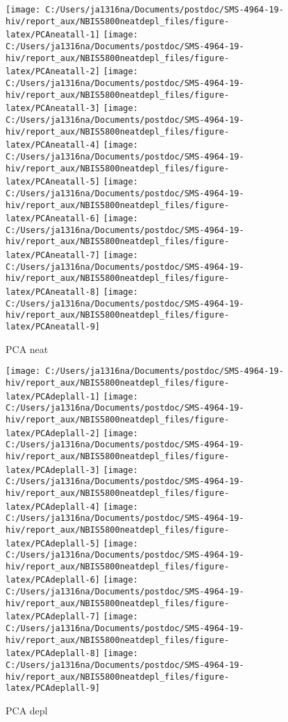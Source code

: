 \documentclass[
]{article}
\begin{document}
\begin{figure}
\texttt{[image: C:/Users/ja1316na/Documents/postdoc/SMS-4964-19-hiv/report\_aux/NBIS5800neatdepl\_files/figure-latex/PCAneatall-1]} \texttt{[image: C:/Users/ja1316na/Documents/postdoc/SMS-4964-19-hiv/report\_aux/NBIS5800neatdepl\_files/figure-latex/PCAneatall-2]} \texttt{[image: C:/Users/ja1316na/Documents/postdoc/SMS-4964-19-hiv/report\_aux/NBIS5800neatdepl\_files/figure-latex/PCAneatall-3]} \texttt{[image: C:/Users/ja1316na/Documents/postdoc/SMS-4964-19-hiv/report\_aux/NBIS5800neatdepl\_files/figure-latex/PCAneatall-4]} \texttt{[image: C:/Users/ja1316na/Documents/postdoc/SMS-4964-19-hiv/report\_aux/NBIS5800neatdepl\_files/figure-latex/PCAneatall-5]} \texttt{[image: C:/Users/ja1316na/Documents/postdoc/SMS-4964-19-hiv/report\_aux/NBIS5800neatdepl\_files/figure-latex/PCAneatall-6]} \texttt{[image: C:/Users/ja1316na/Documents/postdoc/SMS-4964-19-hiv/report\_aux/NBIS5800neatdepl\_files/figure-latex/PCAneatall-7]} \texttt{[image: C:/Users/ja1316na/Documents/postdoc/SMS-4964-19-hiv/report\_aux/NBIS5800neatdepl\_files/figure-latex/PCAneatall-8]} \texttt{[image: C:/Users/ja1316na/Documents/postdoc/SMS-4964-19-hiv/report\_aux/NBIS5800neatdepl\_files/figure-latex/PCAneatall-9]} \caption{PCA neat}\label{fig:PCAneatall}
\end{figure}

\begin{figure}
\texttt{[image: C:/Users/ja1316na/Documents/postdoc/SMS-4964-19-hiv/report\_aux/NBIS5800neatdepl\_files/figure-latex/PCAdeplall-1]} \texttt{[image: C:/Users/ja1316na/Documents/postdoc/SMS-4964-19-hiv/report\_aux/NBIS5800neatdepl\_files/figure-latex/PCAdeplall-2]} \texttt{[image: C:/Users/ja1316na/Documents/postdoc/SMS-4964-19-hiv/report\_aux/NBIS5800neatdepl\_files/figure-latex/PCAdeplall-3]} \texttt{[image: C:/Users/ja1316na/Documents/postdoc/SMS-4964-19-hiv/report\_aux/NBIS5800neatdepl\_files/figure-latex/PCAdeplall-4]} \texttt{[image: C:/Users/ja1316na/Documents/postdoc/SMS-4964-19-hiv/report\_aux/NBIS5800neatdepl\_files/figure-latex/PCAdeplall-5]} \texttt{[image: C:/Users/ja1316na/Documents/postdoc/SMS-4964-19-hiv/report\_aux/NBIS5800neatdepl\_files/figure-latex/PCAdeplall-6]} \texttt{[image: C:/Users/ja1316na/Documents/postdoc/SMS-4964-19-hiv/report\_aux/NBIS5800neatdepl\_files/figure-latex/PCAdeplall-7]} \texttt{[image: C:/Users/ja1316na/Documents/postdoc/SMS-4964-19-hiv/report\_aux/NBIS5800neatdepl\_files/figure-latex/PCAdeplall-8]} \texttt{[image: C:/Users/ja1316na/Documents/postdoc/SMS-4964-19-hiv/report\_aux/NBIS5800neatdepl\_files/figure-latex/PCAdeplall-9]} \caption{PCA depl}\label{fig:PCAdeplall}
\end{figure}
\end{document}
